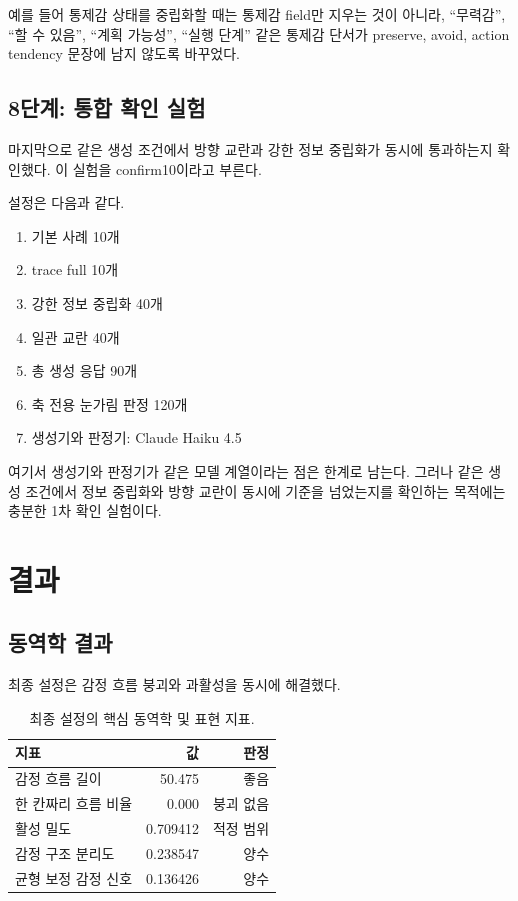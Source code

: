 \documentclass[11pt,a4paper]{article}
\begin{document}
예를 들어 통제감 상태를 중립화할 때는 통제감 field만 지우는 것이 아니라, ``무력감'', ``할 수 있음'', ``계획 가능성'', ``실행 단계'' 같은 통제감 단서가 preserve, avoid, action tendency 문장에 남지 않도록 바꾸었다.

\subsection{8단계: 통합 확인 실험}

마지막으로 같은 생성 조건에서 방향 교란과 강한 정보 중립화가 동시에 통과하는지 확인했다. 이 실험을 confirm10이라고 부른다.

설정은 다음과 같다.

\begin{enumerate}
  \item 기본 사례 10개
  \item trace full 10개
  \item 강한 정보 중립화 40개
  \item 일관 교란 40개
  \item 총 생성 응답 90개
  \item 축 전용 눈가림 판정 120개
  \item 생성기와 판정기: Claude Haiku 4.5
\end{enumerate}

여기서 생성기와 판정기가 같은 모델 계열이라는 점은 한계로 남는다. 그러나 같은 생성 조건에서 정보 중립화와 방향 교란이 동시에 기준을 넘었는지를 확인하는 목적에는 충분한 1차 확인 실험이다.

\section{결과}

\subsection{동역학 결과}

최종 설정은 감정 흐름 붕괴와 과활성을 동시에 해결했다.

\begin{table}[h]
\centering
\small
\begin{tabular}{lrr}
\toprule
지표 & 값 & 판정 \\
\midrule
감정 흐름 길이 & 50.475 & 좋음 \\
한 칸짜리 흐름 비율 & 0.000 & 붕괴 없음 \\
활성 밀도 & 0.709412 & 적정 범위 \\
감정 구조 분리도 & 0.238547 & 양수 \\
균형 보정 감정 신호 & 0.136426 & 양수 \\
\bottomrule
\end{tabular}
\caption{최종 설정의 핵심 동역학 및 표현 지표.}
\label{tab:core-results}
\end{table}
\end{document}
